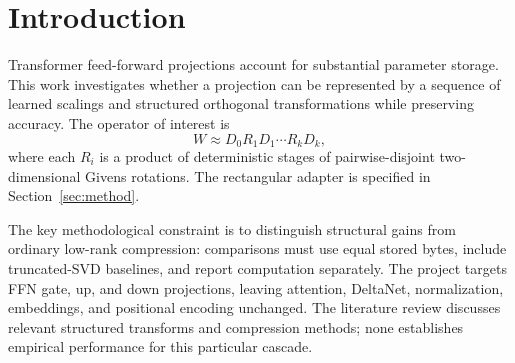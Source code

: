 \section{Introduction}
Transformer feed-forward projections account for substantial parameter storage. This work investigates whether a projection can be represented by a sequence of learned scalings and structured orthogonal transformations while preserving accuracy. The operator of interest is
\[
W \approx D_0 R_1 D_1 \cdots R_k D_k,
\]
where each $R_i$ is a product of deterministic stages of pairwise-disjoint two-dimensional Givens rotations. The rectangular adapter is specified in Section~\ref{sec:method}.

The key methodological constraint is to distinguish structural gains from ordinary low-rank compression: comparisons must use equal stored bytes, include truncated-SVD baselines, and report computation separately. The project targets FFN gate, up, and down projections, leaving attention, DeltaNet, normalization, embeddings, and positional encoding unchanged. The literature review discusses relevant structured transforms and compression methods; none establishes empirical performance for this particular cascade.
